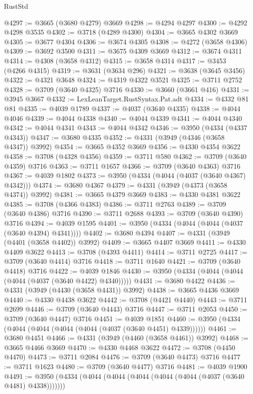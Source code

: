 \begin{lexlean}{RustStd}
\begin{coremodule}
@4297 := @3665 (@3680 @4279) @3669
@4298 := @4294 @4297
@4300 := @4292 @4298 @3535
@4302 := @3718 (@4289 @4300)
@4304 := @3665 @4302 @3669
@4305 := @3677 @4304
@4306 := @3674 @4305
@4308 := @4272 (@3658 @4306)
@4309 := @3692 @3500
@4311 := @3675 @4309 @3669
@4312 := @3674 @4311
@4314 := @4308 (@3658 @4312)
@4315 := @3658 @4314
@4317 := @3453 (@4266 @4315)
@4319 := @3631 (@3634 @296)
@4321 := @3638 (@3645 @3456)
@4322 := @4321 @3648
@4324 := @4319 @4322 @3521
@4325 := @3711 @2752
@4328 := @3709 (@3640 @4325) @3716
@4330 := @3660 (@3661 @416)
@4331 := @3945 @3667
@4332 := LexLeanTarget.RustSyntax.Pat.adt
@4334 := @4332 @81 @81
@4335 := @4039 @1789
@4337 := @4037 (@3640 @4335)
@4338 := @4044 @4046
@4339 := @4044 @4338
@4340 := @4044 @4339
@4341 := @4044 @4340
@4342 := @4044 @4341
@4343 := @4044 @4342
@4346 := @3950 (@4334 (@4337 @4343))
@4347 := @3680 @4335
@4352 := @4331 (@3949 (@4346 (@3658 @4347)) @3992)
@4354 := @3665 @4352 @3669
@4356 := @4330 @4354 @3622
@4358 := @3708 (@4328 @4356)
@4359 := @3711 @580
@4362 := @3709 (@3640 @4359) @3716
@4363 := @3711 @1657
@4366 := @3709 (@3640 @4363) @3716
@4367 := @4039 @1802
@4373 := @3950 (@4334 (@4044 (@4037 (@3640 @4367) @4342)))
@4374 := @3680 @4367
@4379 := @4331 (@3949 (@4373 (@3658 @4374)) @3992)
@4381 := @3665 @4379 @3669
@4383 := @4330 @4381 @3622
@4385 := @3708 (@4366 @4383)
@4386 := @3711 @2763
@4389 := @3709 (@3640 @4386) @3716
@4390 := @3711 @2688
@4393 := @3709 (@3640 @4390) @3716
@4394 := @4039 @1595
@4401 := @3950 (@4334 (@4044 (@4044 (@4037 (@3640 @4394) @4341))))
@4402 := @3680 @4394
@4407 := @4331 (@3949 (@4401 (@3658 @4402)) @3992)
@4409 := @3665 @4407 @3669
@4411 := @4330 @4409 @3622
@4413 := @3708 (@4393 @4411)
@4414 := @3711 @2725
@4417 := @3709 (@3640 @4414) @3716
@4418 := @3711 @1640
@4421 := @3709 (@3640 @4418) @3716
@4422 := @4039 @1846
@4430 := @3950 (@4334 (@4044 (@4044 (@4044 (@4037 (@3640 @4422) @4340)))))
@4431 := @3680 @4422
@4436 := @4331 (@3949 (@4430 (@3658 @4431)) @3992)
@4438 := @3665 @4436 @3669
@4440 := @4330 @4438 @3622
@4442 := @3708 (@4421 @4440)
@4443 := @3711 @2699
@4446 := @3709 (@3640 @4443) @3716
@4447 := @3711 @2053
@4450 := @3709 (@3640 @4447) @3716
@4451 := @4039 @1851
@4460 := @3950 (@4334 (@4044 (@4044 (@4044 (@4044 (@4037 (@3640 @4451) @4339))))))
@4461 := @3680 @4451
@4466 := @4331 (@3949 (@4460 (@3658 @4461)) @3992)
@4468 := @3665 @4466 @3669
@4470 := @4330 @4468 @3622
@4472 := @3708 (@4450 @4470)
@4473 := @3711 @2084
@4476 := @3709 (@3640 @4473) @3716
@4477 := @3711 @1623
@4480 := @3709 (@3640 @4477) @3716
@4481 := @4039 @1900
@4491 := @3950 (@4334 (@4044 (@4044 (@4044 (@4044 (@4044 (@4037 (@3640 @4481) @4338)))))))

\end{coremodule}
\end{lexlean}
